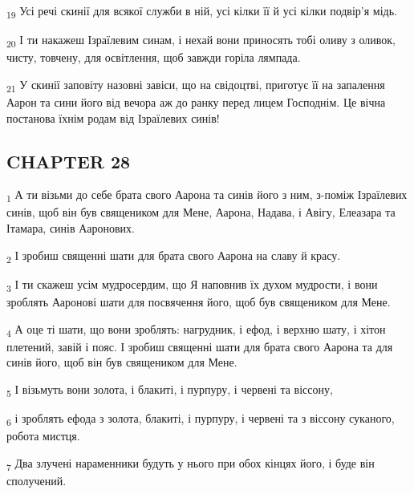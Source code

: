 \begin{tcolorbox}
\textsubscript{19} Усі речі скинії для всякої служби в ній, усі кілки її й усі кілки подвір'я мідь.
\end{tcolorbox}
\begin{tcolorbox}
\textsubscript{20} І ти накажеш Ізраїлевим синам, і нехай вони приносять тобі оливу з оливок, чисту, товчену, для освітлення, щоб завжди горіла лямпада.
\end{tcolorbox}
\begin{tcolorbox}
\textsubscript{21} У скинії заповіту назовні завіси, що на свідоцтві, приготує її на запалення Аарон та сини його від вечора аж до ранку перед лицем Господнім. Це вічна постанова їхнім родам від Ізраїлевих синів!
\end{tcolorbox}
\subsection{CHAPTER 28}
\begin{tcolorbox}
\textsubscript{1} А ти візьми до себе брата свого Аарона та синів його з ним, з-поміж Ізраїлевих синів, щоб він був священиком для Мене, Аарона, Надава, і Авігу, Елеазара та Ітамара, синів Ааронових.
\end{tcolorbox}
\begin{tcolorbox}
\textsubscript{2} І зробиш священні шати для брата свого Аарона на славу й красу.
\end{tcolorbox}
\begin{tcolorbox}
\textsubscript{3} І ти скажеш усім мудросердим, що Я наповнив їх духом мудрости, і вони зроблять Ааронові шати для посвячення його, щоб був священиком для Мене.
\end{tcolorbox}
\begin{tcolorbox}
\textsubscript{4} А оце ті шати, що вони зроблять: нагрудник, і ефод, і верхню шату, і хітон плетений, завій і пояс. І зробиш священні шати для брата свого Аарона та для синів його, щоб він був священиком для Мене.
\end{tcolorbox}
\begin{tcolorbox}
\textsubscript{5} І візьмуть вони золота, і блакиті, і пурпуру, і червені та віссону,
\end{tcolorbox}
\begin{tcolorbox}
\textsubscript{6} і зроблять ефода з золота, блакиті, і пурпуру, і червені та з віссону суканого, робота мистця.
\end{tcolorbox}
\begin{tcolorbox}
\textsubscript{7} Два злучені нараменники будуть у нього при обох кінцях його, і буде він сполучений.
\end{tcolorbox}
